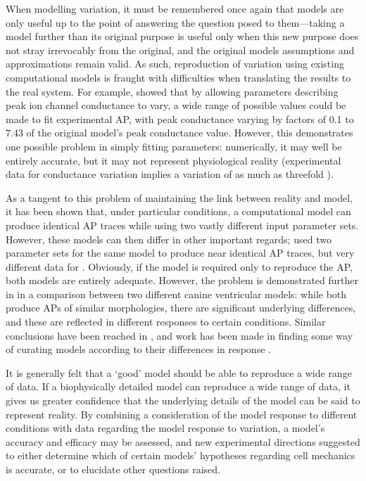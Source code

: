 \documentclass[../thesis-main.tex]{subfiles}
\begin{document}
When modelling variation, it must be remembered once again that models are only useful up to the point of answering the question posed to them---taking a model further than its original purpose is useful only when this new purpose does not stray irrevocably from the original, and the original models assumptions and approximations remain valid. As such, reproduction of variation using existing computational models is fraught with difficulties when translating the results to the real system. For example,  \citet{Davies2012} showed that by allowing parameters describing peak ion channel conductance to vary, a wide range of possible values could be made to fit experimental AP, with peak conductance varying by factors of 0.1 to 7.43 of the original model's peak conductance value. However, this demonstrates one possible problem in simply fitting parameters: numerically, it may well be entirely accurate, but it may not represent physiological reality (experimental data for conductance variation implies a variation of as much as threefold \citep{Schulz2006}).

As a tangent to this problem of maintaining the link between reality and model, it has been shown that, under particular conditions, a computational model can produce identical AP traces while using two vastly different input parameter sets. However, these models can then differ in other important regards; \citet{Sarkar2010} used two parameter sets for the same model to produce near identical AP traces, but very different data for \cai{}. Obviously, if the model is required only to reproduce the AP, both models are entirely adequate. However, the problem is demonstrated further in \citet{Cherry2007} in a comparison between two different canine ventricular models: while both produce APs of similar morphologies, there are significant underlying differences, and these are reflected in different responses to certain conditions. Similar conclusions have been reached in \citet{Romero2011}, and work has been made in finding some way of curating models according to their differences in response \citep{Terkildsen2008, Cooper2011}.

It is generally felt that a `good' model should be able to reproduce a wide range of data. If a biophysically detailed model can reproduce a wide range of data, it gives us greater confidence that the underlying details of the model can be said to represent reality. By combining a consideration of the model response to different conditions with data regarding the model response to variation, a model's accuracy and efficacy may be assessed, and new experimental directions suggested to either determine which of certain models' hypotheses regarding cell mechanics is accurate, or to elucidate other questions raised.
\end{document}
